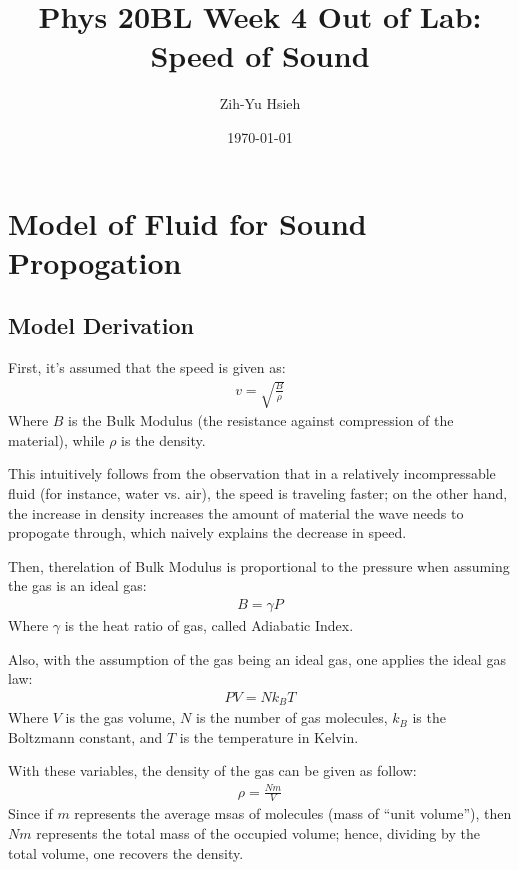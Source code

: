 \documentclass{article}
\title{Phys 20BL Week 4 Out of Lab: Speed of Sound}
\author{Zih-Yu Hsieh}
\date{\today}
\begin{document}
\maketitle

\tableofcontents

\newpage

\section{Model of Fluid for Sound Propogation}
\subsection{Model Derivation}
First, it's assumed that the speed is given as:
\begin{align}
    v=\sqrt{\frac{B}{\rho}}
\end{align}
Where $B$ is the Bulk Modulus (the resistance against compression of the material), while $\rho$ is the density. 

This intuitively follows from the observation that in a relatively incompressable fluid (for instance, water vs. air), the speed is traveling faster; on the other hand, the increase in density increases the amount of material the wave needs to propogate through, which naively explains the decrease in speed.

\hfil

Then, therelation of Bulk Modulus is proportional to the pressure when assuming the gas is an ideal gas:
\begin{align}
    B=\gamma P
\end{align}
Where $\gamma$ is the heat ratio of gas, called Adiabatic Index. 

\hfil

Also, with the assumption of the gas being an ideal gas, one applies the ideal gas law:
\begin{align}
    PV = N k_B T
\end{align}
Where $V$ is the gas volume, $N$ is the number of gas molecules, $k_B$ is the Boltzmann constant, and $T$ is the temperature in Kelvin.

With these variables, the density of the gas can be given as follow:
\begin{align}
    \rho = \frac{N m}{V}
\end{align}
Since if $m$ represents the average msas of molecules (mass of ``unit volume''), then $N m$ represents the total mass of the occupied volume; hence, dividing by the total volume, one recovers the density.
\end{document}
